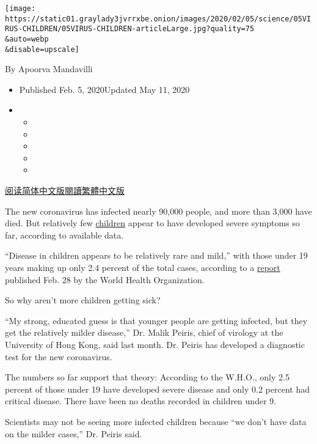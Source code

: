 \texttt{[image: https://static01.graylady3jvrrxbe.onion/images/2020/02/05/science/05VIRUS-CHILDREN/05VIRUS-CHILDREN-articleLarge.jpg?quality=75\\\&auto=webp\\\&disable=upscale]}

By Apoorva Mandavilli

\begin{itemize}
\item
  Published Feb. 5, 2020Updated May 11, 2020
\item
  \begin{itemize}
  \item
  \item
  \item
  \item
  \item
  \end{itemize}
\end{itemize}

\href{https://cn.nytimes3xbfgragh.onion/health/20200206/coronavirus-children/}{阅读简体中文版}\href{https://cn.nytimes3xbfgragh.onion/health/20200206/coronavirus-children/zh-hant/}{閱讀繁體中文版}

The new coronavirus has infected nearly 90,000 people, and more than
3,000 have died. But relatively few
\href{https://www.nytimes3xbfgragh.onion/2020/05/11/health/coronavirus-children-icu.html}{children}
appear to have developed severe symptoms so far, according to available
data.

``Disease in children appears to be relatively rare and mild,'' with
those under 19 years making up only 2.4 percent of the total cases,
according to a
\href{https://www.who.int/docs/default-source/coronaviruse/who-china-joint-mission-on-covid-19-final-report.pdf}{report}
published Feb. 28 by the World Health Organization.

So why aren't more children getting sick?

``My strong, educated guess is that younger people are getting infected,
but they get the relatively milder disease,'' Dr. Malik Peiris, chief of
virology at the University of Hong Kong, said last month. Dr. Peiris has
developed a diagnostic test for the new coronavirus.

The numbers so far support that theory: According to the W.H.O., only
2.5 percent of those under 19 have developed severe disease and only 0.2
percent had critical disease. There have been no deaths recorded in
children under 9.

Scientists may not be seeing more infected children because ``we don't
have data on the milder cases,'' Dr. Peiris said.

